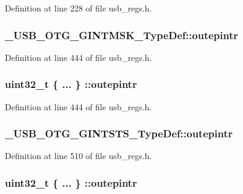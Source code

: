 Definition at line 228 of file usb\-\_\-regs.\-h.

\hypertarget{group___u_s_b___o_t_g___d_r_i_v_e_r_gabc016abba6e4547fa6620cf6141d4f0f}{
\subsubsection[{outepintr}]{ \-\_\-\-U\-S\-B\-\_\-\-O\-T\-G\-\_\-\-G\-I\-N\-T\-M\-S\-K\-\_\-\-Type\-Def\-::outepintr}}\label{group___u_s_b___o_t_g___d_r_i_v_e_r_gabc016abba6e4547fa6620cf6141d4f0f}


Definition at line 444 of file usb\-\_\-regs.\-h.

\hypertarget{group___u_s_b___o_t_g___d_r_i_v_e_r_ga2fe6426eca7b54dd883f919ea41d87a6}{
\subsubsection[{outepintr}]{\setlength{\rightskip}{0pt plus 5cm}uint32\-\_\-t \{ ... \} \-::outepintr}}\label{group___u_s_b___o_t_g___d_r_i_v_e_r_ga2fe6426eca7b54dd883f919ea41d87a6}


Definition at line 444 of file usb\-\_\-regs.\-h.

\hypertarget{group___u_s_b___o_t_g___d_r_i_v_e_r_ga28a8418f5393bdaf76727ed9dfd7d80f}{
\subsubsection[{outepintr}]{ \-\_\-\-U\-S\-B\-\_\-\-O\-T\-G\-\_\-\-G\-I\-N\-T\-S\-T\-S\-\_\-\-Type\-Def\-::outepintr}}\label{group___u_s_b___o_t_g___d_r_i_v_e_r_ga28a8418f5393bdaf76727ed9dfd7d80f}


Definition at line 510 of file usb\-\_\-regs.\-h.

\hypertarget{group___u_s_b___o_t_g___d_r_i_v_e_r_ga03c57c64dead209da46250adedee7bed}{
\subsubsection[{outepintr}]{\setlength{\rightskip}{0pt plus 5cm}uint32\-\_\-t \{ ... \} \-::outepintr}}\label{group___u_s_b___o_t_g___d_r_i_v_e_r_ga03c57c64dead209da46250adedee7bed}


